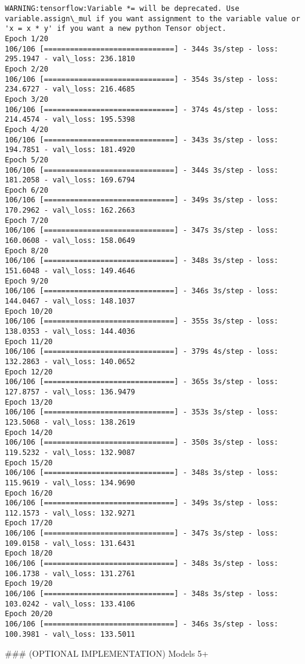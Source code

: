 \documentclass[11pt]{article}
\begin{document}
    \begin{Verbatim}[commandchars=\\\{\}]
WARNING:tensorflow:Variable *= will be deprecated. Use variable.assign\_mul if you want assignment to the variable value or 'x = x * y' if you want a new python Tensor object.
Epoch 1/20
106/106 [==============================] - 344s 3s/step - loss: 295.1947 - val\_loss: 236.1810
Epoch 2/20
106/106 [==============================] - 354s 3s/step - loss: 234.6727 - val\_loss: 216.4685
Epoch 3/20
106/106 [==============================] - 374s 4s/step - loss: 214.4574 - val\_loss: 195.5398
Epoch 4/20
106/106 [==============================] - 343s 3s/step - loss: 194.7851 - val\_loss: 181.4920
Epoch 5/20
106/106 [==============================] - 344s 3s/step - loss: 181.2058 - val\_loss: 169.6794
Epoch 6/20
106/106 [==============================] - 349s 3s/step - loss: 170.2962 - val\_loss: 162.2663
Epoch 7/20
106/106 [==============================] - 347s 3s/step - loss: 160.0608 - val\_loss: 158.0649
Epoch 8/20
106/106 [==============================] - 348s 3s/step - loss: 151.6048 - val\_loss: 149.4646
Epoch 9/20
106/106 [==============================] - 346s 3s/step - loss: 144.0467 - val\_loss: 148.1037
Epoch 10/20
106/106 [==============================] - 355s 3s/step - loss: 138.0353 - val\_loss: 144.4036
Epoch 11/20
106/106 [==============================] - 379s 4s/step - loss: 132.2863 - val\_loss: 140.0652
Epoch 12/20
106/106 [==============================] - 365s 3s/step - loss: 127.8757 - val\_loss: 136.9479
Epoch 13/20
106/106 [==============================] - 353s 3s/step - loss: 123.5068 - val\_loss: 138.2619
Epoch 14/20
106/106 [==============================] - 350s 3s/step - loss: 119.5232 - val\_loss: 132.9087
Epoch 15/20
106/106 [==============================] - 348s 3s/step - loss: 115.9619 - val\_loss: 134.9690
Epoch 16/20
106/106 [==============================] - 349s 3s/step - loss: 112.1573 - val\_loss: 132.9271
Epoch 17/20
106/106 [==============================] - 347s 3s/step - loss: 109.0158 - val\_loss: 131.6431
Epoch 18/20
106/106 [==============================] - 348s 3s/step - loss: 106.1738 - val\_loss: 131.2761
Epoch 19/20
106/106 [==============================] - 348s 3s/step - loss: 103.0242 - val\_loss: 133.4106
Epoch 20/20
106/106 [==============================] - 346s 3s/step - loss: 100.3981 - val\_loss: 133.5011

    \end{Verbatim}

     \#\#\# (OPTIONAL IMPLEMENTATION) Models 5+
\end{document}
